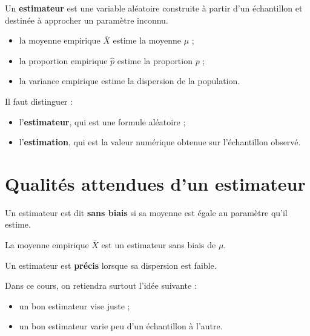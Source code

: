 \begin{Def}
Un \textbf{estimateur} est une variable aléatoire construite à partir d'un échantillon et destinée à approcher un paramètre inconnu.
\end{Def}

\begin{Ex}
\begin{itemize}
    \item la moyenne empirique $\overline{X}$ estime la moyenne $\mu$ ;
    \item la proportion empirique $\widehat{p}$ estime la proportion $p$ ;
    \item la variance empirique estime la dispersion de la population.
\end{itemize}
\end{Ex}

\begin{Rmq}
Il faut distinguer :
\begin{itemize}
    \item l'\textbf{estimateur}, qui est une formule aléatoire ;
    \item l'\textbf{estimation}, qui est la valeur numérique obtenue sur l'échantillon observé.
\end{itemize}
\end{Rmq}

\section{Qualités attendues d'un estimateur}

\begin{Def}
Un estimateur est dit \textbf{sans biais} si sa moyenne est égale au paramètre qu'il estime.
\end{Def}

\begin{Ex}
La moyenne empirique $\overline{X}$ est un estimateur sans biais de $\mu$.
\end{Ex}

\begin{Def}
Un estimateur est \textbf{précis} lorsque sa dispersion est faible.
\end{Def}

\begin{Rmq}
Dans ce cours, on retiendra surtout l'idée suivante :
\begin{itemize}
    \item un bon estimateur vise juste ;
    \item un bon estimateur varie peu d'un échantillon à l'autre.
\end{itemize}
\end{Rmq}

